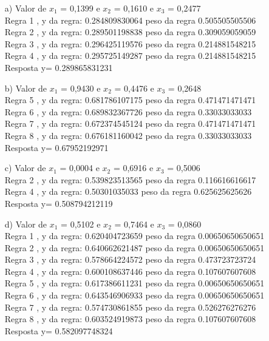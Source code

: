 \documentclass{report}
\begin{document}
\begin{enumerate}
\begin{enumerate}
\item[a)] Valor de $x_1$ = 0,1399 e $x_2$ = 0,1610 e $x_3$ = 0,2477\\
Regra 1 , y da regra: 0.284809830064 peso da regra 0.505505505506 \\
Regra 2 , y da regra: 0.289501198838 peso da regra 0.309059059059 \\
Regra 3 , y da regra: 0.296425119576 peso da regra 0.214881548215 \\
Regra 4 , y da regra: 0.295725149287 peso da regra 0.214881548215 \\
Resposta y= 0.289865831231

\item[b)]Valor de $x_1$ = 0,9430 e $x_2$ = 0,4476 e $x_3$ = 0,2648\\
Regra 5 , y da regra: 0.681786107175 peso da regra 0.471471471471 \\
Regra 6 , y da regra: 0.689832367726 peso da regra 0.33033033033 \\
Regra 7 , y da regra: 0.672374545124 peso da regra 0.471471471471 \\
Regra 8 , y da regra: 0.676181160042 peso da regra 0.33033033033 \\
Resposta y= 0.67952192971

\item[c)]Valor de $x_1$ = 0,0004 e $x_2$ = 0,6916 e $x_3$ = 0,5006\\
Regra 2 , y da regra: 0.539823513565 peso da regra 0.116616616617 \\
Regra 4 , y da regra: 0.50301035033 peso da regra 0.625625625626 \\
Resposta y= 0.508794212119

\item[d)]Valor de $x_1$ = 0,5102 e $x_2$ = 0,7464 e $x_3$ = 0,0860\\
Regra 1 , y da regra: 0.620404723659 peso da regra 0.00650650650651 \\
Regra 2 , y da regra: 0.640662621487 peso da regra 0.00650650650651 \\
Regra 3 , y da regra: 0.578664224572 peso da regra 0.473723723724 \\
Regra 4 , y da regra: 0.600108637446 peso da regra 0.107607607608 \\
Regra 5 , y da regra: 0.617386611231 peso da regra 0.00650650650651 \\
Regra 6 , y da regra: 0.643546906933 peso da regra 0.00650650650651 \\
Regra 7 , y da regra: 0.574730861855 peso da regra 0.526276276276 \\
Regra 8 , y da regra: 0.603524919873 peso da regra 0.107607607608 \\
Resposta y= 0.582097748324


\end{enumerate}
\end{enumerate}
\end{document}
